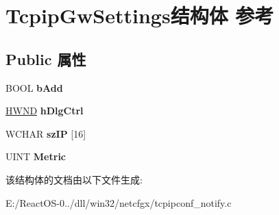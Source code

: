 \hypertarget{struct_tcpip_gw_settings}{}\section{Tcpip\+Gw\+Settings结构体 参考}
\label{struct_tcpip_gw_settings}
\subsection*{Public 属性}
\begin{DoxyCompactItemize}
\item 
\mbox{\label{struct_tcpip_gw_settings_a9be43181c98ae1d07b03ea9d024a7285}} 
B\+O\+OL {\bfseries b\+Add}
\item 
\mbox{\label{struct_tcpip_gw_settings_af92dd3e2f12e325676a58601ed01aeb7}} 
\hyperlink{interfacevoid}{H\+W\+ND} {\bfseries h\+Dlg\+Ctrl}
\item 
\mbox{\label{struct_tcpip_gw_settings_a2b782a4448d61c3e5cc10be21fabcea6}} 
W\+C\+H\+AR {\bfseries sz\+IP} \mbox{[}16\mbox{]}
\item 
\mbox{\label{struct_tcpip_gw_settings_a072e8c93a66957626bfa3fcd4178b671}} 
U\+I\+NT {\bfseries Metric}
\end{DoxyCompactItemize}


该结构体的文档由以下文件生成\+:\begin{DoxyCompactItemize}
\item 
E\+:/\+React\+O\+S-\/0../dll/win32/netcfgx/tcpipconf\+\_\+notify.\+c\end{DoxyCompactItemize}
